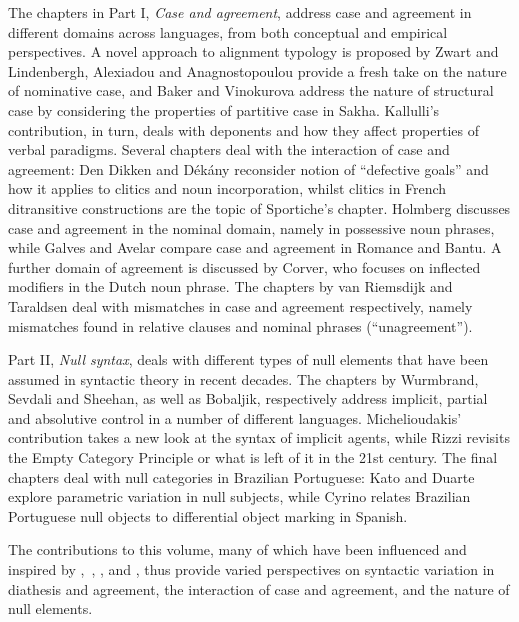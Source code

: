 \documentclass[output=paper]{langsci/langscibook}
\begin{document}
The chapters in Part I, \emph{Case and agreement}, address case and agreement
in different domains across languages, from both conceptual and empirical
perspectives. A novel approach to alignment typology is proposed by Zwart and
Lindenbergh, Alexiadou and Anagnostopoulou provide a fresh take on the nature
of nominative case, and Baker and Vinokurova address the nature of structural
case by considering the properties of partitive case in Sakha. Kallulli’s
contribution, in turn, deals with deponents and how they affect properties of
verbal paradigms. Several chapters deal with the interaction of case and
agreement: Den Dikken and Dékány reconsider  notion of
“defective goals” and how it applies to clitics and noun incorporation, whilst
clitics in French ditransitive constructions are the topic of Sportiche’s
chapter. Holmberg discusses case and agreement in the nominal domain, namely in
possessive noun phrases, while Galves and Avelar compare case and agreement in
Romance and Bantu. A further domain of agreement is discussed by Corver, who
focuses on inflected modifiers in the Dutch noun phrase. The chapters by van
Riemsdijk and Taraldsen deal with mismatches in case and agreement
respectively, namely mismatches found in relative clauses and nominal phrases
(\enquote{unagreement}).

Part II, \emph{Null syntax}, deals with different types of null elements that
have been assumed in syntactic theory in recent decades. The chapters by
Wurmbrand, Sevdali and Sheehan, as well as Bobaljik, respectively address
implicit, partial and absolutive control in a number of different languages.
Michelioudakis’ contribution takes a new look at the syntax of implicit agents,
while Rizzi revisits the Empty Category Principle or what is left of it in the
21st century. The final chapters deal with null categories in Brazilian
Portuguese: Kato and Duarte explore parametric variation in null subjects,
while Cyrino relates Brazilian Portuguese null objects to differential object
marking in Spanish.

The contributions to this volume, many of which have been influenced and
inspired by \textcite{Roberts2010,Roberts2012},~\textcite{RobRou2003},
\textcite{RobHol2010}, and \textcite{BibRob2015}, thus provide varied
perspectives on syntactic variation in diathesis and agreement, the interaction
of case and agreement, and the nature of null elements.

{\sloppy
\printbibliography[heading=subbibliography,notkeyword=this]
}
\end{document}

